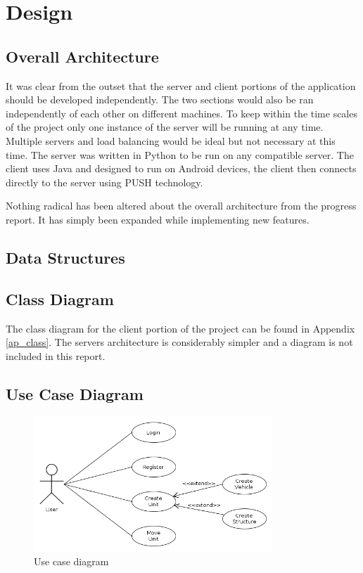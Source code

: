 \chapter{Design}
\section{Overall Architecture}
It was clear from the outset that the server and client portions of the application should be developed independently. The two sections would also be ran independently of each other on different machines. To keep within the time scales of the project only one instance of the server will be running at any time. Multiple servers and load balancing would be ideal but not necessary at this time. The server was written in Python to be run on any compatible server. The client uses Java and designed to run on Android devices, the client then connects directly to the server using PUSH technology.

Nothing radical has been altered about the overall architecture from the progress report. It has simply been expanded while implementing new features.

\section{Data Structures}

\section{Class Diagram}
The class diagram for the client portion of the project can be found in Appendix \ref{ap_class}. The servers architecture is considerably simpler and a diagram is not included in this report.

\section{Use Case Diagram}

\begin{figure}[H]
  \centering
   \includegraphics[width=0.8\textwidth]{Images/diagrams/use.png}
  \caption{Use case diagram}
  \label{fig:use}
\end{figure}




